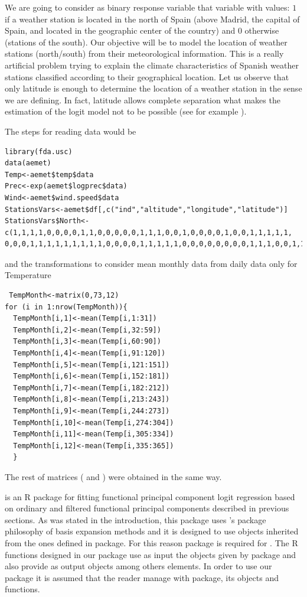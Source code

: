 We are going to consider as binary response variable that variable with values: $1$ if a weather station is located in the north of Spain (above Madrid, the capital of Spain, and located in the geographic center of the country) and $0$ otherwise (stations of the south). Our objective will be to model the location of weather stations (north/south) from their meteorological information. This is a really artificial problem trying to explain the climate characteristics of Spanish weather stations classified according to their geographical location. Let us observe that only latitude is enough to determine the location of a weather station in the sense we are defining. In fact, latitude allows complete separation what makes the estimation of the logit model not to be possible (see for example \cite{Hosmer13}). 

The steps for reading data would be

\begin{verbatim}
library(fda.usc)
data(aemet)
Temp<-aemet$temp$data
Prec<-exp(aemet$logprec$data)
Wind<-aemet$wind.speed$data
StationsVars<-aemet$df[,c("ind","altitude","longitude","latitude")]
StationsVars$North<-c(1,1,1,1,0,0,0,0,1,1,0,0,0,0,0,1,1,1,0,0,1,0,0,0,0,1,0,0,1,1,1,1,1,
0,0,0,1,1,1,1,1,1,1,1,1,0,0,0,0,1,1,1,1,1,0,0,0,0,0,0,0,0,1,1,1,0,0,1,1,1,1,1,1)
\end{verbatim}

\noindent and the transformations to consider mean monthly data from daily data only for Temperature

\begin{verbatim}
 TempMonth<-matrix(0,73,12)
for (i in 1:nrow(TempMonth)){
  TempMonth[i,1]<-mean(Temp[i,1:31])
  TempMonth[i,2]<-mean(Temp[i,32:59])
  TempMonth[i,3]<-mean(Temp[i,60:90])
  TempMonth[i,4]<-mean(Temp[i,91:120])
  TempMonth[i,5]<-mean(Temp[i,121:151])
  TempMonth[i,6]<-mean(Temp[i,152:181])
  TempMonth[i,7]<-mean(Temp[i,182:212])
  TempMonth[i,8]<-mean(Temp[i,213:243])
  TempMonth[i,9]<-mean(Temp[i,244:273])
  TempMonth[i,10]<-mean(Temp[i,274:304])
  TempMonth[i,11]<-mean(Temp[i,305:334])
  TempMonth[i,12]<-mean(Temp[i,335:365])
  }
\end{verbatim}

The rest of matrices ( and ) were obtained in the same way.

 is an R package for fitting functional principal component logit regression based on ordinary and filtered functional principal components described in previous sections. As was stated in the introduction, this package uses 's package philosophy of basis expansion methods and it is designed to use objects inherited from the ones defined in  package. For this reason  package is required for . The R functions designed in our package use as input the  objects given by  package and also provide as output  objects among others elements. In order to use our package it is assumed that the reader manage with  package, its objects and functions. 

